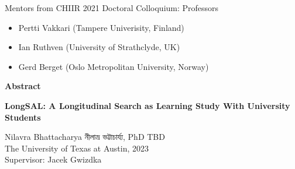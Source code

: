 \documentclass[letterpaper, nobind]{templates/ociamthesis}
\providecommand{\tightlist}{%
  \setlength{\itemsep}{0pt}\setlength{\parskip}{0pt}}
\begin{document}
\begin{romanpages}
\begin{acknowledgements}
 Mentors from CHIIR 2021 Doctoral Colloquium: Professors

 \begin{itemize}
 \tightlist
 \item
   Pertti Vakkari (Tampere Univerisity, Finland)
 \item
   Ian Ruthven (University of Strathclyde, UK)
 \item
   Gerd Berget (Oslo Metropolitan University, Norway)
 \end{itemize}
\end{acknowledgements}






\begin{center}
  \textbf{Abstract}\\
  
  \vspace{18pt}
  
  \begin{spacing}{2}
    {\Large{\textbf{LongSAL: A Longitudinal Search as Learning Study With University Students}}}
  \end{spacing}

  \vspace{18pt}

  \begin{spacing}{1.4}
    Nilavra Bhattacharya 
    {\secondlanguage নীলাভ্র ভট্টাচার্য্য}, 
    PhD TBD\\
    The University of Texas at Austin, 
    2023\\
    \vspace{18pt}
    Supervisor: Jacek Gwizdka
  \end{spacing}

\end{center}


\end{romanpages}
\end{document}
